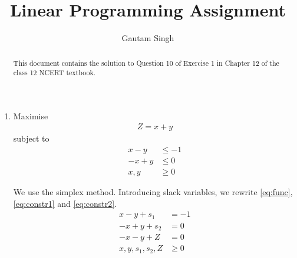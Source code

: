 \documentclass[journal,12pt,twocolumn]{IEEEtran}
\begin{document}
\vspace{3cm}
\title{Linear Programming Assignment}
\author{Gautam Singh}
\maketitle
\bigskip

\begin{abstract}
    This document contains the solution to Question 10 of 
    Exercise 1 in Chapter 12 of the class 12 NCERT textbook.
\end{abstract}

\begin{enumerate}
    \item Maximise 
    \begin{align}
        Z = x + y
        \label{eq:func}
    \end{align}
    subject to 
    \begin{align}
        x - y &\le -1 \label{eq:constr1} \\
        -x + y &\le 0 \label{eq:constr2} \\
        x, y &\ge 0
    \end{align}

    \solution We use the simplex method. Introducing slack variables,
    we rewrite \eqref{eq:func}, \eqref{eq:constr1} and \eqref{eq:constr2}.
    \begin{align}
        x - y + s_1 &= -1 \\
        -x + y + s_2 &= 0 \\
        -x - y + Z &= 0 \\
        x, y, s_1, s_2, Z &\ge 0
    \end{align}


\end{enumerate}
\end{document}
